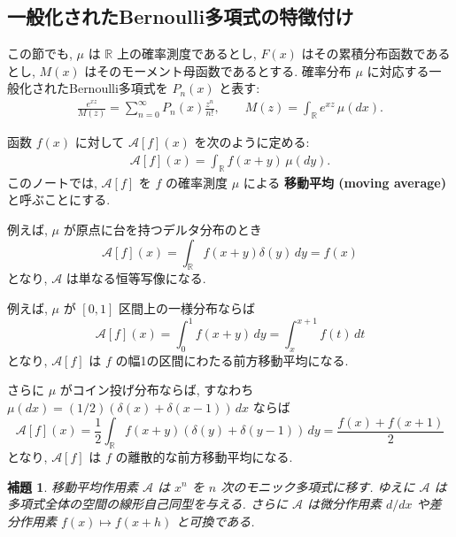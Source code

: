 \documentclass[12pt,twoside]{jarticle}
\newcommand\BF{\bfseries}
\newcommand\R{{\mathbb R}} %
\newcommand\A{{\mathscr A}}
\theoremstyle{jplain}
\newtheorem{lemma}[theorem]{補題}
\theoremstyle{jplain}
\theoremstyle{jplain}
\numberwithin{theorem}{section}
\numberwithin{equation}{section}
\numberwithin{figure}{section}
\numberwithin{table}{section}
\begin{document}

\subsection{一般化されたBernoulli多項式の特徴付け}
\label{sec:S}

この節でも,
$\mu$ は $\R$ 上の確率測度であるとし,
$F(x)$ はその累積分布函数であるとし,
$M(x)$ はそのモーメント母函数であるとする.
確率分布 $\mu$ に対応する一般化されたBernoulli多項式を $P_n(x)$ と表す:
\begin{align*}
  \frac{e^{xz}}{M(z)}=\sum_{n=0}^\infty P_n(x)\frac{z^n}{n!},
  \qquad
  M(z) = \int_\R e^{xz}\,\mu(dx).
\end{align*}

函数 $f(x)$ に対して $\A[f](x)$ を次のように定める:
\begin{align*}
  \A[f](x) = \int_\R f(x+y)\,\mu(dy).
\end{align*}
このノートでは, $\A[f]$ を $f$ の確率測度 $\mu$ による
{\BF 移動平均 (moving average)}と呼ぶことにする.

例えば, $\mu$ が原点に台を持つデルタ分布のとき
\begin{equation*}
  \A[f](x)=\int_\R f(x+y)\delta(y)\,dy = f(x)
\end{equation*}
となり, $\A$ は単なる恒等写像になる.

例えば, $\mu$ が $[0,1]$ 区間上の一様分布ならば
\begin{equation*}
  \A[f](x)
  = \int_0^1 f(x+y)\,dy
  = \int_{x}^{x+1} f(t)\,dt
\end{equation*}
となり, $\A[f]$ は $f$ の幅1の区間にわたる前方移動平均になる.

さらに $\mu$ がコイン投げ分布ならば,
すなわち $\mu(dx)=(1/2)(\delta(x)+\delta(x-1))\,dx$ ならば
\begin{equation*}
  \A[f](x)
  =\frac12\int_\R f(x+y)(\delta(y)+\delta(y-1))\,dy
  =\frac{f(x)+f(x+1)}2
\end{equation*}
となり, $\A[f]$ は $f$ の離散的な前方移動平均になる.

\begin{lemma}
  \label{lemma:A}
  移動平均作用素 $\A$ は $x^n$ を $n$ 次のモニック多項式に移す.
  ゆえに $\A$ は多項式全体の空間の線形自己同型を与える.
  さらに $\A$ は微分作用素 $d/dx$ や差分作用素 $f(x)\mapsto f(x+h)$
  と可換である.
\end{lemma}
\end{document}
